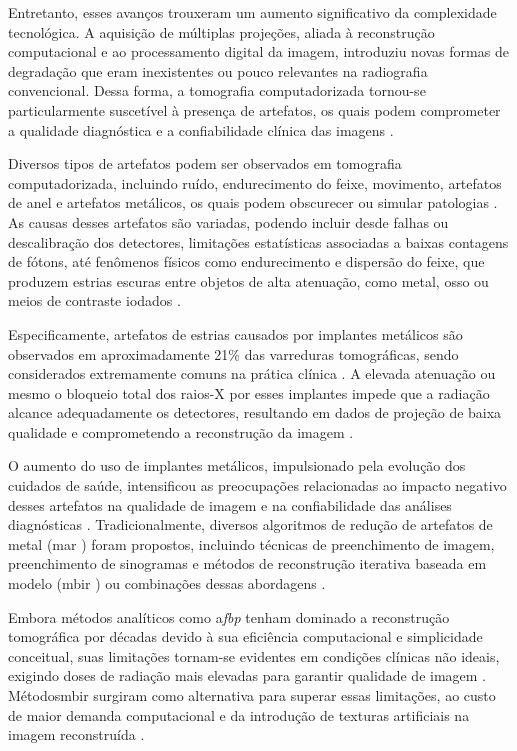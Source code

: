 Entretanto, esses avanços trouxeram um aumento significativo da complexidade tecnológica. A aquisição de múltiplas projeções, aliada à reconstrução computacional e ao processamento digital da imagem, introduziu novas formas de degradação que eram inexistentes ou pouco relevantes na radiografia convencional. Dessa forma, a tomografia computadorizada tornou-se particularmente suscetível à presença de artefatos, os quais podem comprometer a qualidade diagnóstica e a confiabilidade clínica das imagens \cite{schulzHowCTHappened2021}.

Diversos tipos de artefatos podem ser observados em tomografia computadorizada, incluindo ruído, endurecimento do feixe, movimento, artefatos de anel e artefatos metálicos, os quais podem obscurecer ou simular patologias \cite{boasCTArtifactsCauses2012}. As causas desses artefatos são
variadas, podendo incluir desde falhas ou descalibração dos detectores, limitações estatísticas associadas a baixas contagens de fótons, até fenômenos físicos como endurecimento e dispersão do feixe, que produzem estrias escuras entre objetos de alta atenuação, como metal, osso ou meios de contraste iodados \cite{schulzHowCTHappened2021}.

Especificamente, artefatos de estrias causados por implantes metálicos são observados em aproximadamente 21\% das varreduras tomográficas, sendo considerados extremamente comuns na prática clínica \cite{schulzHowCTHappened2021}. A elevada atenuação ou mesmo o bloqueio total dos raios-X por esses implantes impede que a radiação alcance adequadamente os detectores, resultando em dados de projeção de baixa qualidade e comprometendo a reconstrução da imagem \cite{kleberAdvancementsSupervisedDeep2024}.

O aumento do uso de implantes metálicos, impulsionado pela evolução dos cuidados de saúde, intensificou as preocupações relacionadas ao impacto negativo desses artefatos na qualidade de imagem e na confiabilidade das análises diagnósticas \cite{kleberAdvancementsSupervisedDeep2024}. Tradicionalmente, diversos algoritmos de redução de artefatos de metal (\acrshort{mar} ) foram propostos, incluindo técnicas de preenchimento de imagem, preenchimento de sinogramas e métodos de reconstrução iterativa baseada em modelo (\acrshort{mbir} ) ou combinações dessas abordagens \cite{puvanasunthararajahApplicationMetalArtifact2021}.

Embora métodos analíticos como a\textit{\acrfull{fbp}} tenham dominado a reconstrução tomográfica por décadas devido à sua eficiência computacional e simplicidade conceitual, suas limitações tornam-se evidentes em condições clínicas não ideais, exigindo doses de radiação mais elevadas para garantir qualidade de imagem \cite{sahuTransformingCTImaging2025}. Métodos\acrshort{mbir} surgiram como alternativa para superar essas limitações, ao custo de maior demanda computacional e da introdução de texturas artificiais na imagem reconstruída \cite{sahuTransformingCTImaging2025}.

